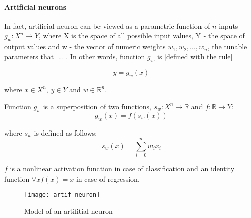 \paragraph{Artificial neurons} 

In fact, artificial neuron can be viewed as a parametric function of $ n $ inputs $ g_{w}:X^{n} \rightarrow Y $, where X is the space of all possible input values, Y - the space of output values and w - the vector of numeric weights $ w_{1}, w_{2}, ..., w_{n} $, the tunable parameters that [...]. In other words, function $ g_{w} $ is [defined with the rule]

\begin{equation}
  y = g_{w}(x)
\end{equation}

where $ x \in X^{n} $, $ y \in Y $ and $ w \in \mathbb{R}^{n} $.

Function $ g_{w} $ is a superposition of two functions, $ s_{w}:X^{n} \rightarrow \mathbb{R} $ and $ f:\mathbb{R} \rightarrow Y $:
\[ g_{w}(x) = f(s_{w}(x)) \]

where $ s_{w} $ is defined as follows:
\[ s_{w}(x) = \sum_{i=0}^{n} w_{i}x_{i} \]

$ f $ is a nonlinear activation function in case of classification and an identity function $ \forall x f(x) = x $ in case of regression.

\begin{figure}[H]
  \centering
  \texttt{[image: artif\_neuron]}
  \caption[Model of an artifitial neuron]{Model of an artifitial neuron\footnotemark}
  \label{fig:artifneuron}
\end{figure}


%
